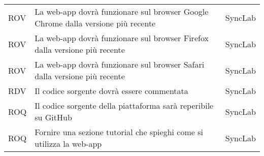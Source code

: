 \begin{center}
\begin{longtable}{ |p{1.5cm}|p{9cm}|p{1.5cm}|  }
        ROV&La web-app dovrà funzionare sul browser Google Chrome dalla versione più recente&SyncLab\\
        ROV&La web-app dovrà funzionare sul browser Firefox dalla versione più recente&SyncLab\\
        ROV&La web-app dovrà funzionare sul browser Safari dalla versione più recente&SyncLab\\
        RDV&Il codice sorgente dovrà essere commentata&SyncLab\\
        ROQ&Il codice sorgente della piattaforma sarà reperibile su GitHub&SyncLab\\
        ROQ&Fornire una sezione tutorial che spieghi come si utilizza la web-app&SyncLab\\
       
\hline
\end{longtable}
\end{center}